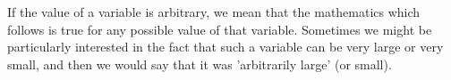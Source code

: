 If the value of a variable is arbitrary, we mean that the mathematics
which follows is true for any possible value of that variable. Sometimes
we might be particularly interested in the fact that such a variable can 
be very large or very small, and then we would say that it was 'arbitrarily 
large' (or small).
